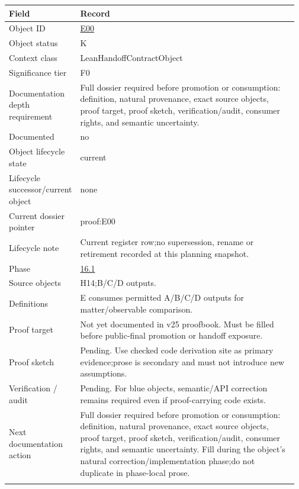 \begin{longtable}{L{0.16\linewidth} L{0.81\linewidth}}
\hline
\textbf{Field} & \textbf{Record}\\
\hline
Object ID & \hyperlink{object-row-E00}{E00}\\
\hline\addlinespace[0.20em]
Object status & K\\
\hline\addlinespace[0.20em]
Context class & LeanHandoffContractObject\\
\hline\addlinespace[0.20em]
Significance tier & F0\\
\hline\addlinespace[0.20em]
Documentation depth requirement & Full dossier required before promotion or consumption: definition, natural provenance, exact source objects, proof target, proof sketch, verification/\allowbreak{}audit, consumer rights, and semantic uncertainty.\\
\hline\addlinespace[0.20em]
Documented & no\\
\hline\addlinespace[0.20em]
Object lifecycle state & current\\
\hline\addlinespace[0.20em]
Lifecycle successor/\allowbreak{}current object & none\\
\hline\addlinespace[0.20em]
Current dossier pointer & proof:E00\\
\hline\addlinespace[0.20em]
Lifecycle note & Current register row;\newline no supersession, rename or retirement recorded at this planning snapshot.\\
\hline\addlinespace[0.20em]
Phase & \hyperlink{phase-row-16-1}{16.1}\\
\hline\addlinespace[0.20em]
Source objects & H14;\newline B/\allowbreak{}C/\allowbreak{}D outputs.\\
\hline\addlinespace[0.20em]
Definitions & E consumes permitted A/\allowbreak{}B/\allowbreak{}C/\allowbreak{}D outputs for matter/\allowbreak{}observable comparison.\\
\hline\addlinespace[0.20em]
Proof target & Not yet documented in v25 proofbook. Must be filled before public-final promotion or handoff exposure.\\
\hline\addlinespace[0.20em]
Proof sketch & Pending. Use checked code derivation site as primary evidence;\newline prose is secondary and must not introduce new assumptions.\\
\hline\addlinespace[0.20em]
Verification /\allowbreak{} audit & Pending. For blue objects, semantic/\allowbreak{}API correction remains required even if proof-carrying code exists.\\
\hline\addlinespace[0.20em]
Next documentation action & Full dossier required before promotion or consumption: definition, natural provenance, exact source objects, proof target, proof sketch, verification/\allowbreak{}audit, consumer rights, and semantic uncertainty. Fill during the object's natural correction/\allowbreak{}implementation phase;\newline do not duplicate in phase-local prose.\\
\hline\addlinespace[0.20em]
\end{longtable}
